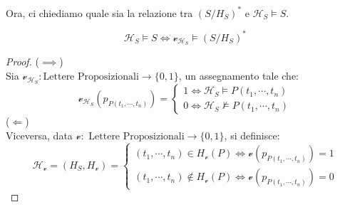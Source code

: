 Ora, ci chiediamo quale sia la relazione tra $(S/H_S)^*$ e $\mathscr{H}_S \models S$.
\begin{lemn}
\label{lem:herbrand-sodd}
  $$
  \mathscr{H}_S \models S \iff \mathcal{v}_{\mathscr{H}_S}\models (S/H_S)^*
  $$
\end{lemn}
\begin{proof} ($\implies$) \\
Sia $\mathcal{v}_{\mathscr{H}_S}: \text{Lettere Proposizionali} \rightarrow \{0,1\}$, un assegnamento tale che:
$$
\mathcal{v}_{\mathscr{H}_S}(p_{P(t_1, \cdots, t_n)}) =
\begin{cases}
  1 \iff \mathscr{H}_S \models P(t_1, \cdots, t_n) \\
  0 \iff \mathscr{H}_S \nvDash P(t_1, \cdots, t_n)
\end{cases}
$$
($\Longleftarrow$) \\
Viceversa, data $\mathcal{v}: \text{ Lettere Proposizionali} \rightarrow \{0,1\}$, si definisce:
$$
\mathscr{H}_{\mathcal{v}}= (H_S, H_{\mathcal{v}}) =
\begin{cases}
  (t_1, \cdots, t_n) \in H_{\mathcal{v}}(P) \iff \mathcal{v}(p_{P(t_1, \cdots, t_n)}) = 1 \\
  (t_1, \cdots, t_n) \not\in H_{\mathcal{v}}(P) \iff \mathcal{v}(p_{P(t_1, \cdots, t_n)}) = 0
\end{cases}
$$
\end{proof}

